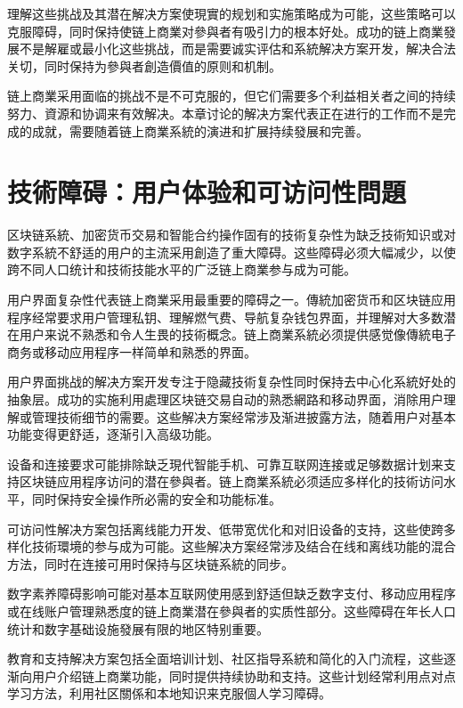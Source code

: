 \documentclass[
  Letterpaper,
]{scrbook}
\begin{document}
理解这些挑战及其潜在解决方案使現實的规划和实施策略成为可能，这些策略可以克服障碍，同时保持使链上商業对參與者有吸引力的根本好处。成功的链上商業發展不是解雇或最小化这些挑战，而是需要诚实评估和系統解决方案开发，解决合法关切，同时保持为參與者創造價值的原则和机制。

链上商業采用面临的挑战不是不可克服的，但它们需要多个利益相关者之间的持续努力、資源和协调来有效解决。本章讨论的解决方案代表正在进行的工作而不是完成的成就，需要随着链上商業系統的演进和扩展持续發展和完善。

\section{技術障碍：用户体验和可访问性問題}\label{ux6280ux8853ux969cux788dux7528ux6237ux4f53ux9a8cux548cux53efux8bbfux95eeux6027ux554fux984c}

区块链系統、加密货币交易和智能合约操作固有的技術复杂性为缺乏技術知识或对数字系統不舒适的用户的主流采用創造了重大障碍。这些障碍必须大幅减少，以使跨不同人口统计和技術技能水平的广泛链上商業参与成为可能。

用户界面复杂性代表链上商業采用最重要的障碍之一。傳統加密货币和区块链应用程序经常要求用户管理私钥、理解燃气费、导航复杂钱包界面，并理解对大多数潜在用户来说不熟悉和令人生畏的技術概念。链上商業系統必须提供感觉像傳統电子商务或移动应用程序一样简单和熟悉的界面。

用户界面挑战的解决方案开发专注于隐藏技術复杂性同时保持去中心化系統好处的抽象层。成功的实施利用處理区块链交易自动的熟悉網路和移动界面，消除用户理解或管理技術细节的需要。这些解决方案经常涉及渐进披露方法，随着用户对基本功能变得更舒适，逐渐引入高级功能。

设备和连接要求可能排除缺乏現代智能手机、可靠互联网连接或足够数据计划来支持区块链应用程序访问的潜在參與者。链上商業系統必须适应多样化的技術访问水平，同时保持安全操作所必需的安全和功能标准。

可访问性解决方案包括离线能力开发、低带宽优化和对旧设备的支持，这些使跨多样化技術環境的参与成为可能。这些解决方案经常涉及结合在线和离线功能的混合方法，同时在连接可用时保持与区块链系統的同步。

数字素养障碍影响可能对基本互联网使用感到舒适但缺乏数字支付、移动应用程序或在线账户管理熟悉度的链上商業潜在參與者的实质性部分。这些障碍在年长人口统计和数字基础设施發展有限的地区特别重要。

教育和支持解决方案包括全面培训计划、社区指导系統和简化的入门流程，这些逐渐向用户介绍链上商業功能，同时提供持续协助和支持。这些计划经常利用点对点学习方法，利用社区關係和本地知识来克服個人学习障碍。
\end{document}
